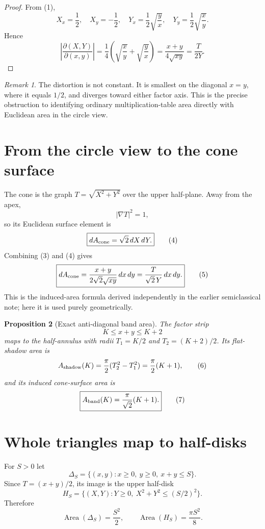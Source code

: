 \documentclass[11pt]{amsart}
\newtheorem{proposition}{Proposition}
\theoremstyle{remark}
\newtheorem{remark}[proposition]{Remark}
\begin{document}
\begin{proof}
From (1),
\[
X_x=\frac12,\quad X_y=-\frac12,\quad
Y_x=\frac12\sqrt{\frac yx},\quad
Y_y=\frac12\sqrt{\frac xy}.
\]
Hence
\[
\left|\frac{\partial(X,Y)}{\partial(x,y)}\right|
=\frac14\left(\sqrt{\frac xy}+\sqrt{\frac yx}\right)
=\frac{x+y}{4\sqrt{xy}}
=\frac{T}{2Y}.
\]
\end{proof}

\begin{remark}
The distortion is not constant. It is smallest on the diagonal $x=y$, where it equals $1/2$, and diverges toward either factor axis. This is the precise obstruction to identifying ordinary multiplication-table area directly with Euclidean area in the circle view.
\end{remark}

\section{From the circle view to the cone surface}
The cone is the graph $T=\sqrt{X^2+Y^2}$ over the upper half-plane. Away from the apex,
\[
|\nabla T|^2=1,
\]
so its Euclidean surface element is
\begin{equation}
\boxed{dA_{\rm cone}=\sqrt2\,dX\,dY.}\tag{4}
\end{equation}
Combining (3) and (4) gives
\begin{equation}
\boxed{
 dA_{\rm cone}=\frac{x+y}{2\sqrt2\sqrt{xy}}\,dx\,dy
 =\frac{T}{\sqrt2\,Y}\,dx\,dy.}
\tag{5}
\end{equation}
This is the induced-area formula derived independently in the earlier semiclassical note; here it is used purely geometrically.

\begin{proposition}[Exact anti-diagonal band area]\label{prop:band}
The factor strip
\[
K\le x+y\le K+2
\]
maps to the half-annulus with radii $T_1=K/2$ and $T_2=(K+2)/2$. Its flat-shadow area is
\begin{equation}
A_{\rm shadow}(K)=\frac\pi2(T_2^2-T_1^2)=\frac\pi2(K+1), \tag{6}
\end{equation}
and its induced cone-surface area is
\begin{equation}
\boxed{A_{\rm band}(K)=\frac\pi{\sqrt2}(K+1).}\tag{7}
\end{equation}
\end{proposition}

\section{Whole triangles map to half-disks}
For $S>0$ let
\[
\Delta_S=\{(x,y):x\ge0,\ y\ge0,\ x+y\le S\}.
\]
Since $T=(x+y)/2$, its image is the upper half-disk
\[
H_S=\{(X,Y):Y\ge0,\ X^2+Y^2\le(S/2)^2\}.
\]
Therefore
\[
\operatorname{Area}(\Delta_S)=\frac{S^2}{2},
\qquad
\operatorname{Area}(H_S)=\frac{\pi S^2}{8}.
\]
\end{document}
